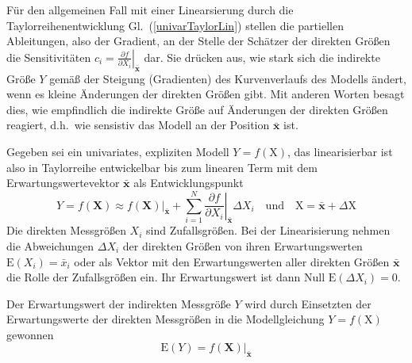 Für den allgemeinen Fall mit einer Linearsierung durch die Taylorreihenentwicklung
Gl.~(\ref{univarTaylorLin}) stellen die partiellen Ableitungen, also der Gradient, an
der Stelle der Schätzer der direkten Größen die Sensitivitäten
$c_i = \left. \frac{\partial f}{\partial X_i} \right|_{\bar{\mathbf{x}}}$ dar. Sie drücken aus,
wie stark sich die indirekte Größe $Y$ gemäß der Steigung (Gradienten) des Kurvenverlaufs des Modells
ändert, wenn es kleine Änderungen der direkten Größen gibt. Mit anderen Worten besagt dies, wie
empfindlich die indirekte Größe auf Änderungen der direkten Größen reagiert, d.h.\ wie sensistiv
das Modell an der Position $\bar{\mathbf{x}}$ ist.

Gegeben sei ein univariates, expliziten Modell $Y = f(\mathrm{X})$, das linearisierbar ist also
in Taylorreihe entwickelbar bis zum linearen Term mit dem Erwartungswertevektor
$\bar{\mathbf{x}}$ als Entwicklungspunkt
\begin{equation}
Y = f(\mathbf{X}) \approx \left. f(\mathbf{X}) \right|_{\bar{\mathbf{x}}} +
\sum_{i=1}^N \left.
\frac{\partial f}{\partial X_i} \right|_{\bar{\mathbf{x}}} \Delta X_i
\quad \text{und} \quad \mathrm{X} = \bar{\mathbf{x}} + \Delta \mathrm{X}
\label{linearisiertesModellY}
\end{equation}
Die direkten Messgrößen $X_i$ sind Zufallsgrößen.
Bei der Linearisierung nehmen die Abweichungen $\Delta X_i$ der direkten Größen von ihren Erwartungswerten
$\mathrm{E}(X_i) = \bar x_i$ oder als Vektor mit den Erwartungswerten aller direkten Größen
$\bar{\mathbf{x}}$ die Rolle der Zufallsgrößen ein. Ihr Erwartungswert ist dann
Null $\mathrm{E}(\Delta X_i) = 0$.

Der Erwartungswert der indirekten Messgröße $Y$ wird durch Einsetzten der Erwartungswerte der
direkten Messgrößen in die Modellgleichung $Y = f(\mathrm{X})$ gewonnen
\begin{equation}
\mathrm{E}(Y) = \left. f(\mathbf{X}) \right|_{\bar{\mathbf{x}}}
\end{equation}

